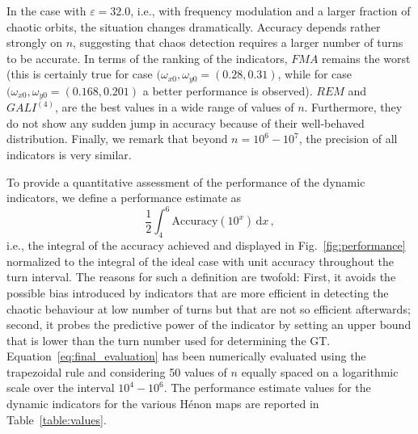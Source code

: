 In the case with $\varepsilon=32.0$, i.e., with frequency modulation and a larger fraction of chaotic orbits, the situation changes dramatically. Accuracy depends rather strongly on $n$, suggesting that chaos detection requires a larger number of turns to be accurate. In terms of the ranking of the indicators, $FMA$ remains the worst (this is certainly true for case $(\omega_{x0}, \omega_{y0}=(0.28, 0.31)$, while for case $(\omega_{x0}, \omega_{y0}=(0.168, 0.201)$ a better performance is observed). $REM$ and $GALI^{(4)}$, are the best values in a wide range of values of $n$. Furthermore, they do not show any sudden jump in accuracy because of their well-behaved distribution. Finally, we remark that beyond $n = 10^6 - 10^7$, the precision of all indicators is very similar.

To provide a quantitative assessment of the performance of the dynamic indicators, we define a performance estimate as
\begin{equation}
    \frac{1}{2}\int_4^6 \text{Accuracy}(10^x) \,\mathrm{d}x \,,
    \label{eq:final_evaluation}
\end{equation}
i.e., the integral of the accuracy achieved and displayed in Fig.~\ref{fig:performance} normalized to the integral of the ideal case with unit accuracy throughout the turn interval. The reasons for such a definition are twofold: First, it avoids the possible bias introduced by indicators that are more efficient in detecting the chaotic behaviour at low number of turns but that are not so efficient afterwards; second, it probes the predictive power of the indicator by setting an upper bound that is lower than the turn number used for determining the GT. Equation~\eqref{eq:final_evaluation} has been numerically evaluated using the trapezoidal rule and considering 50 values of $n$ equally spaced on a logarithmic scale over the interval $10^4-10^6$.  The performance estimate values for the dynamic indicators for the various H\'enon maps are reported in Table~\ref{table:values}. 
